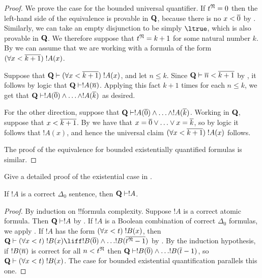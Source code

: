 \documentclass[../../../include/open-logic-section]{subfiles}
\begin{document}
\begin{proof}
    We prove the case for the bounded universal quantifier.
    If $t^\Struct{N} = 0$ then the left-hand side of the
    equivalence is provable in $\mathbf{Q}$, because there is no
    $x<\overline{0}$ by .
    Similarly, we can take an empty disjunction to be simply
    $\ltrue$, which is also provable in $\mathbf{Q}$.
    We therefore suppose that $t^\Struct{N} = k+1$ for some
    natural number $k$. By  we
    can assume that we are working with a formula of the form
    $(\forall x<\overline{k+1})\; !A(x)$.
    
    Suppose that $\Th{Q} \Proves \bforall{x<\num{k+1}}{!A(x)}$,
    and let $n \leq k$. Since $\Th{Q} \Proves \num n < \num{k+1}$
    by , it follows by logic that
    $\Th{Q} \Proves !A(\num n)$. Applying this fact $k+1$ times
    for each $n \leq k$, we get that $\Th{Q} \Proves !A(\num 0)
    \land \dotsc \land !A(\num k)$ as desired.
    
    For the other direction, suppose that $\Th{Q} \Proves
    !A(\num 0) \land \dotsc \land !A(\num k)$. Working in
    $\mathbf{Q}$, suppose that $x < \overline{k+1}$.
    By  we have that
    $x = \overline{0} \lor \dotsc \lor x = \overline{k}$, so by logic it
    follows that $!A(x)$, and hence the universal claim
    $(\forall x<\overline{k+1})\; !A(x)$ follows.
    
    The proof of the equivalence for bounded existentially
    quantified formulas is similar.
\end{proof}

\begin{prob}
Give a detailed proof of the existential case in
.
\end{prob}

\begin{lem}
If $!A$ is a correct $\Delta_0$ sentence,
then $\Th{Q} \Proves !A$.
\end{lem}

\begin{proof}
By induction on !!{formula} complexity.
%
Suppose $!A$ is a correct atomic formula. Then
$\mathbf{Q} \vdash !A$ by .
%
If $!A$ is a Boolean combination of correct $\Delta_0$
formulas, we apply .
%
If $!A$ has the form $(\forall x<t)\; !B(x)$,
then $\Th{Q} \Proves \bforall{x<t}!B(x) \liff
!B(\num 0) \land \dotsc !B(\num{t^\Struct{N}-1})$ by
. By the induction
hypothesis, if $!B(\overline{n})$ is correct for all
$n < t^\Struct{N}$ then $\Th{Q} \Proves !B(\num 0)
\land \dotsc !B(\num t-1)$, so $\Th{Q} \Proves
\bforall{x<t}!B(x)$. The case for bounded existential
quantification parallels this one.
\end{proof}
\end{document}
